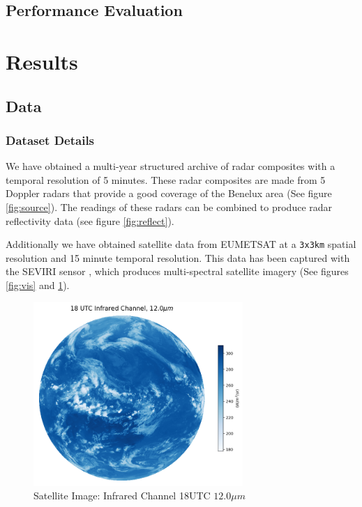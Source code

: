 \documentclass[acmtog, authorversion]{acmart}
\begin{document}
\subsection{Performance Evaluation}



\section{Results}

\subsection{Data}

\subsubsection{Dataset Details}

We have obtained a multi-year structured archive of radar composites with a temporal resolution of 5 minutes. These radar composites are made from 5 Doppler radars that provide a good coverage of the Benelux area (See figure \ref{fig:source}). The readings of these radars can be combined to produce radar reflectivity data (see figure \ref{fig:reflect}).
\medskip

Additionally we have obtained satellite data from \textsc{EUMETSAT} at a \texttt{3x3km} spatial resolution and 15 minute temporal resolution. This data has been captured with the \textsc{SEVIRI} sensor \cite{schmid-no-date}, which produces multi-spectral satellite imagery (See figures \ref{fig:vis} and \ref{fig:infra}).

\begin{figure}
    \centering
    \includegraphics[width=225pt]{./images/infrared.png}
    \caption{Satellite Image: Infrared Channel 18UTC $12.0\mu m$}
    \label{fig:infra}
\end{figure}
\end{document}
